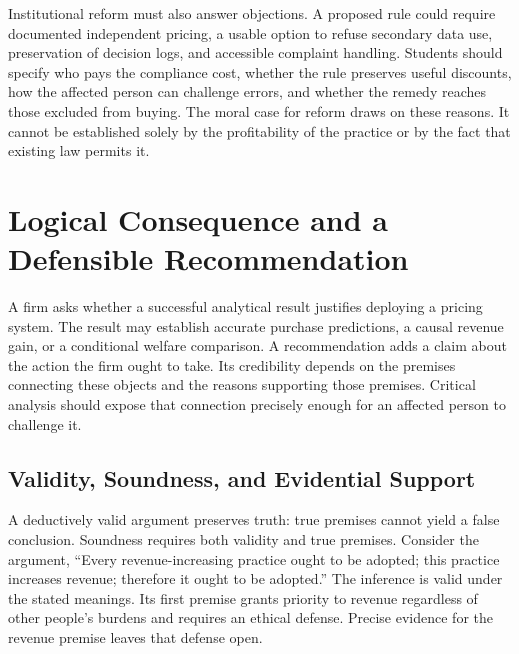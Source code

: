 Institutional reform must also answer objections. A proposed rule could
require documented independent pricing, a usable option to refuse
secondary data use, preservation of decision logs, and accessible
complaint handling. Students should specify who pays the compliance
cost, whether the rule preserves useful discounts, how the affected
person can challenge errors, and whether the remedy reaches those
excluded from buying. The moral case for reform draws on these reasons.
It cannot be established solely by the profitability of the practice or
by the fact that existing law permits it.


\hypertarget{M09-logical-consequence-and-a-defensible-recommendation}{%
\section{Logical Consequence and a Defensible
Recommendation}\label{M09-logical-consequence-and-a-defensible-recommendation}}

\noindent \noindent A firm asks whether a successful analytical result justifies
deploying a pricing system. The result may establish accurate purchase
predictions, a causal revenue gain, or a conditional welfare comparison.
A recommendation adds a claim about the action the firm ought to take.
Its credibility depends on the premises connecting these objects and the
reasons supporting those premises. Critical analysis should expose that
connection precisely enough for an affected person to challenge it.

\hypertarget{M09-validity-soundness-and-evidential-support}{%
\subsection{Validity, Soundness, and Evidential
Support}\label{M09-validity-soundness-and-evidential-support}}

\noindent \noindent A deductively valid argument preserves truth: true premises
cannot yield a false conclusion. Soundness requires both validity and
true premises. Consider the argument, ``Every revenue-increasing
practice ought to be adopted; this practice increases revenue; therefore
it ought to be adopted.'' The inference is valid under the stated
meanings. Its first premise grants priority to revenue regardless of
other people's burdens and requires an ethical defense. Precise evidence
for the revenue premise leaves that defense open.

